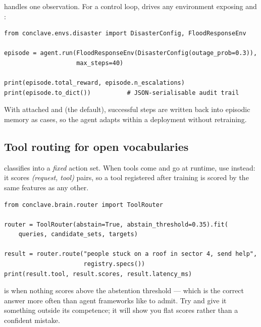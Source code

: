  handles one observation. For a control loop, 
drives any environment exposing  and :

\begin{codebox}[Episodes]
\begin{lstlisting}[style=py]
from conclave.envs.disaster import DisasterConfig, FloodResponseEnv

episode = agent.run(FloodResponseEnv(DisasterConfig(outage_prob=0.3)),
                    max_steps=40)

print(episode.total_reward, episode.n_escalations)
print(episode.to_dict())          # JSON-serialisable audit trail
\end{lstlisting}
\end{codebox}

\noindent With  attached and  (the default),
successful steps are written back into episodic memory as cases, so the agent
adapts within a deployment without retraining.

\subsection{Tool routing for open vocabularies}

 classifies into a \emph{fixed} action set. When tools come
and go at runtime, use  instead: it scores \emph{(request, tool)}
pairs, so a tool registered after training is scored by the same features as
any other.

\begin{codebox}[Routing]
\begin{lstlisting}[style=py]
from conclave.brain.router import ToolRouter

router = ToolRouter(abstain=True, abstain_threshold=0.35).fit(
    queries, candidate_sets, targets)

result = router.route("people stuck on a roof in sector 4, send help",
                      registry.specs())
print(result.tool, result.scores, result.latency_ms)
\end{lstlisting}
\end{codebox}

\noindent {} is  when nothing scores above the
abstention threshold --- which is the correct answer more often than agent
frameworks like to admit. Try  and give it something
outside its competence; it will show you flat scores rather than a confident
mistake.
